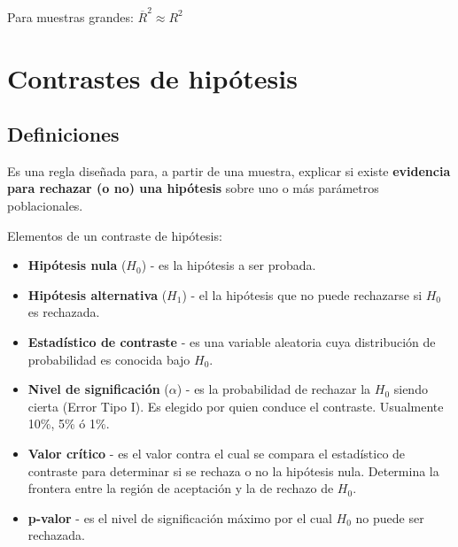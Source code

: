 \documentclass[10pt, a4paper, landscape]{extarticle}
\begin{document}
\begin{multicols}{3}
Para muestras grandes: $\overline{R}^2 \approx R^2$

\section*{Contrastes de hipótesis}

\subsection*{Definiciones}

Es una regla diseñada para, a partir de una muestra, explicar si existe \textbf{evidencia para rechazar (o no) una hipótesis} sobre uno o más parámetros poblacionales.

Elementos de un contraste de hipótesis:

\begin{itemize}[leftmargin=*]
	\item \textbf{Hipótesis nula} ($H_0$) - es la hipótesis a ser probada.
	\item \textbf{Hipótesis alternativa} ($H_1$) - el la hipótesis que no puede rechazarse si $H_0$ es rechazada.
	\item \textbf{Estadístico de contraste} - es una variable aleatoria cuya distribución de probabilidad es conocida bajo $H_0$.
	\item \textbf{Nivel de significación} ($\alpha$) - es la probabilidad de rechazar la $H_0$ siendo cierta (Error Tipo I). Es elegido por quien conduce el contraste. Usualmente 10\%, 5\% ó 1\%.
	\item \textbf{Valor crítico} - es el valor contra el cual se compara el estadístico de contraste para determinar si se rechaza o no la hipótesis nula. Determina la frontera entre la región de aceptación y la de rechazo de $H_0$.
	\item \textbf{p-valor} - es el nivel de significación máximo por el cual $H_0$ no puede ser rechazada.
\end{itemize}


\end{multicols}
\end{document}
